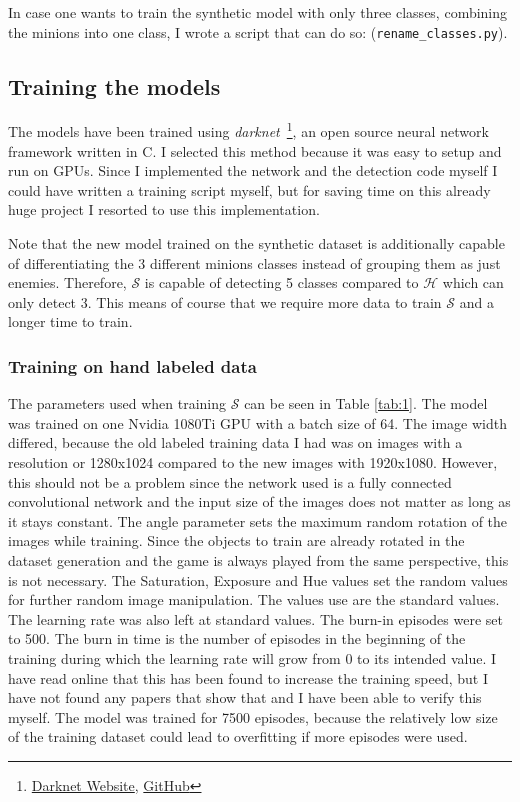 In case one wants to train the synthetic model with only three classes, combining the minions into one class, I wrote a script that can do so: (\texttt{rename\_classes.py}).

\subsection{Training the models}
The models have been trained using \textit{darknet}~\cite{darknet13}\footnote{\href{https://pjreddie.com/darknet/}{Darknet Website}, \href{https://github.com/pjreddie/darknet}{GitHub}}, an open source neural network framework written in C.
I selected this method because it was easy to setup and run on GPUs. Since I implemented the network and the detection code myself I could have written a training script myself, but for saving time on this already huge project I resorted to use this implementation.

Note that the new model trained on the synthetic dataset is additionally capable of differentiating the 3 different minions classes instead of grouping them as just enemies.
Therefore, $\mathcal{S}$ is capable of detecting 5 classes compared to $\mathcal{H}$ which can only detect 3.
This means of course that we require more data to train $\mathcal{S}$ and a longer time to train.

\subsubsection{Training on hand labeled data}
The parameters used when training $\mathcal{S}$ can be seen in Table \ref{tab:1}.
The model was trained on one Nvidia 1080Ti GPU with a batch size of 64. The image width differed, because the old labeled training data I had was on images with a resolution or 1280x1024 compared to the new images with 1920x1080.
However, this should not be a problem since the network used is a fully connected convolutional network and the input size of the images does not matter as long as it stays constant.
The angle parameter sets the maximum random rotation of the images while training.
Since the objects to train are already rotated in the dataset generation and the game is always played from the same perspective, this is not necessary.
The Saturation, Exposure and Hue values set the random values for further random image manipulation.
The values use are the standard values.
The learning rate was also left at standard values.
The burn-in episodes were set to 500.
The burn in time is the number of episodes in the beginning of the training during which the learning rate will grow from 0 to its intended value.
I have read online that this has been found to increase the training speed, but I have not found any papers that show that and I have been able to verify this myself.
The model was trained for 7500 episodes, because the relatively low size of the training dataset could lead to overfitting if more episodes were used.

